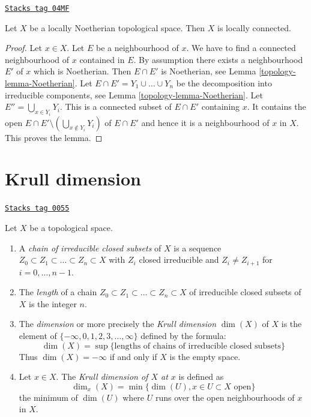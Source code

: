 \begin{lemma}
\label{topology-lemma-locally-Noetherian-locally-connected}
\href{https://stacks.math.columbia.edu/tag/04MF}{\texttt{Stacks tag 04MF}}

Let $X$ be a locally Noetherian topological space.
Then $X$ is locally connected.
\end{lemma}

\begin{proof}

Let $x \in X$. Let $E$ be a neighbourhood of $x$.
We have to find a connected neighbourhood of $x$ contained
in $E$. By assumption there exists a neighbourhood $E'$ of $x$
which is Noetherian. Then $E \cap E'$ is Noetherian, see
Lemma \ref{topology-lemma-Noetherian}.
Let $E \cap E' = Y_1 \cup \ldots \cup Y_n$ be the decomposition
into irreducible components, see
Lemma \ref{topology-lemma-Noetherian}.
Let $E'' = \bigcup_{x \in Y_i} Y_i$. This is a connected
subset of $E \cap E'$ containing $x$. It contains the open
$E \cap E' \setminus (\bigcup_{x \not \in Y_i} Y_i)$ of $E \cap E'$
and hence it is a neighbourhood of $x$ in $X$. This proves the lemma.
\end{proof}

\section{Krull dimension}
\label{topology-section-krull-dimension}
\begin{definition}[Krull]
\label{topology-definition-Krull}
\href{https://stacks.math.columbia.edu/tag/0055}{\texttt{Stacks tag 0055}}

Let $X$ be a topological space.
\begin{enumerate}
\item A {\it chain of irreducible closed subsets} of $X$
is a sequence $Z_0 \subset Z_1 \subset \ldots \subset Z_n \subset X$
with $Z_i$ closed irreducible and $Z_i \not = Z_{i + 1}$ for
$i = 0, \ldots, n - 1$.
\item The {\it length} of a chain
$Z_0 \subset Z_1 \subset \ldots \subset Z_n \subset X$
of irreducible closed subsets of $X$ is the
integer $n$.
\item The {\it dimension} or more precisely the {\it Krull dimension}
$\dim(X)$ of $X$ is the element of
$\{-\infty, 0, 1, 2, 3, \ldots, \infty\}$ defined by the formula:
$$
\dim(X) =
\sup \{\text{lengths of chains of irreducible closed subsets}\}
$$
Thus $\dim(X) = -\infty$ if and only if $X$ is the empty space.
\item Let $x \in X$.
The {\it Krull dimension of $X$ at $x$} is defined as
$$
\dim_x(X) = \min \{\dim(U), x\in U\subset X\text{ open}\}
$$
the minimum of $\dim(U)$ where $U$ runs over the open
neighbourhoods of $x$ in $X$.
\end{enumerate}
\end{definition}

